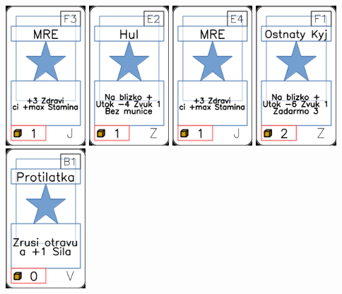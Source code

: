 \documentclass[a4paper]{article}
\begin{document}
	\includegraphics[width=3.0cm]{img-1_27}
	\includegraphics[width=3.0cm]{img-1_81}
	\includegraphics[width=3.0cm]{img-1_23}
	\includegraphics[width=3.0cm]{img-1_85}
	\includegraphics[width=3.0cm]{img-1_65}
\end{document}
